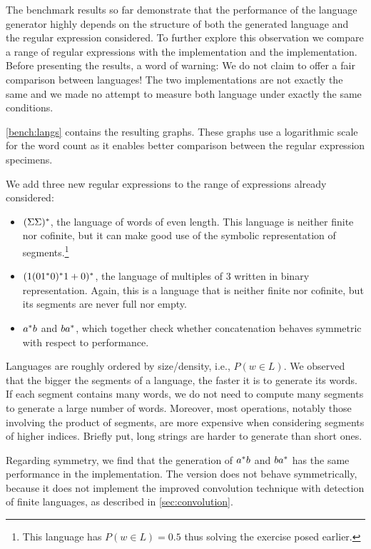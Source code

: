 The benchmark results so far demonstrate that the performance of the language
generator highly depends on the structure of both
the generated language and the regular expression considered.
To further explore this observation we compare a range of regular expressions
with the  \haskell implementation and the 
\ocaml implementation.
Before presenting the results, a word of warning:
We do not claim to offer a fair comparison between languages!
The two implementations are not exactly the same and we made no attempt
to measure both language under exactly the same conditions.

\cref{bench:langs} contains the resulting graphs.  These graphs use a
logarithmic scale for the word count as it enables better comparison
between the regular expression specimens.

We add three new regular expressions to the range of expressions already considered:
\begin{itemize}
\item $(\Sigma\Sigma)^*$, the language of words of even
  length. This language is neither finite nor cofinite, but it can make
  good use of the symbolic representation of segments.\footnote{This
    language has $P (w \in L) = 0.5$ thus solving the exercise posed
    earlier.}
\item $(1 (01^*0)^*1 +{0})^*$, the language
  of multiples of 3 written in binary representation. Again, this is a language that is neither
  finite nor cofinite, but its segments are never full nor empty.
\item $a^*b$ and $ba^*$, which together check whether
  {concatenation} behaves symmetric with respect to performance.
\end{itemize}

Languages are roughly ordered by size/density, i.e., $P (w\in L)$. We
observed that the bigger the segments of a language, the faster it is
to generate its words.  If each segment contains many words, we do not
need to compute many segments to generate a large number of words.
Moreover, most operations, notably those involving the product of
segments, are more expensive when considering segments of higher
indices. Briefly put, long strings are harder to generate than short
ones.

Regarding symmetry, we find that the generation of $a^*b$ and
$ba^*$ has the same performance in the \haskell implementation.
The \ocaml version does not behave symmetrically, because it does not
implement the improved convolution technique with detection of finite
languages, as described in \cref{sec:convolution}.




